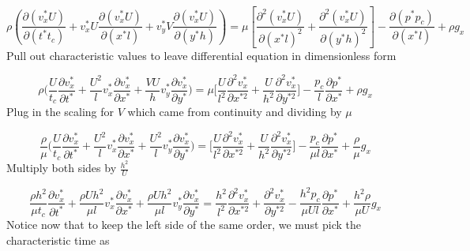 \begin{equation*}
  \rho\left(\frac{\partial(v_{x}^{*}U)}{\partial(t^{*}t_{c})}+v_{x}^{*}U\frac{\partial(v_{x}^{*}U)}{\partial(x^{*}l)}+v_{y}^{*}V\frac{\partial(v_{x}^{*}U)}{\partial(y^{*}h)}\right)=\mu\left[\frac{\partial^{2}(v_{x}^{*}U)}{\partial(x^{*}l)^{2}}+\frac{\partial^{2}(v_{x}^{*}U)}{\partial{}(y^{*}h)^{2}}\right]-\frac{\partial(p^{*}p_{c})}{\partial(x^{*}l)}+\rho{}g_{x}
\end{equation*}
Pull out characteristic values to leave differential equation in dimensionless form

\begin{equation*}
  \rho\biggr(\frac{U}{t_{c}}\frac{\partial{}v_{x}^{*}}{\partial{}t^{*} }+\frac{U^{2}}{l}v_{x}^{*}\frac{\partial{}v_{x}^{*}}{\partial{}x^{*}}+\frac{VU}{h}v_{y}^{*}\frac{\partial{}v_{x}^{*}}{\partial{}y^{*}}\biggr)=\mu\biggr[\frac{U}{l^{2}}\frac{\partial^{2}v_{x}^{*}}{\partial{}x^{*2}}+\frac{U}{h^{2}}\frac{\partial^{2}v_{x}^{*}}{\partial{}y^{*2}}\biggr]-\frac{p_{c}}{l}\frac{\partial{}p^{*}}{\partial{}x^{*}}+\rho{}g_{x}
\end{equation*}
Plug in the scaling for $V$ which came from continuity and dividing by $\mu$

\begin{equation*}
  \frac{\rho}{\mu}\biggr(\frac{U}{t_{c}}\frac{\partial{}v_{x}^{*}}{\partial{}t^{*} }+\frac{U^{2}}{l}v_{x}^{*}\frac{\partial{}v_{x}^{*}}{\partial{}x^{*}}+\frac{U^{2}}{l}v_{y}^{*}\frac{\partial{}v_{x}^{*}}{\partial{}y^{*}}\biggr)=\biggr[\frac{U}{l^{2}}\frac{\partial^{2}v_{x}^{*}}{\partial{}x^{*2}}+\frac{U}{h^{2}}\frac{\partial^{2}v_{x}^{*}}{\partial{}y^{*2}}\biggr]-\frac{p_{c}}{\mu{}l}\frac{\partial{}p^{*}}{\partial{}x^{*}}+\frac{\rho}{\mu}g_{x}
\end{equation*}
Multiply both sides by $\frac{h^{2}}{U}$

\begin{equation*}
  \frac{\rho{}h^{2}}{\mu{}t_{c}}\frac{\partial{}v_{x}^{*}}{\partial{}t^{*} }+\frac{\rho{}Uh^{2}}{\mu{}l}v_{x}^{*}\frac{\partial{}v_{x}^{*}}{\partial{}x^{*}}+\frac{\rho{}Uh^{2}}{\mu{}l}v_{y}^{*}\frac{\partial{}v_{x}^{*}}{\partial{}y^{*}}=\frac{h^{2}}{l^{2}}\frac{\partial^{2}v_{x}^{*}}{\partial{}x^{*2}}+\frac{\partial^{2}v_{x}^{*}}{\partial{}y^{*2}}-\frac{h^{2}p_{c}}{\mu{}Ul}\frac{\partial{}p^{*}}{\partial{}x^{*}}+\frac{h^{2}\rho}{\mu{}U} g_{x}
\end{equation*}
Notice now that to keep the left side of the same order, we must pick the characteristic time as

